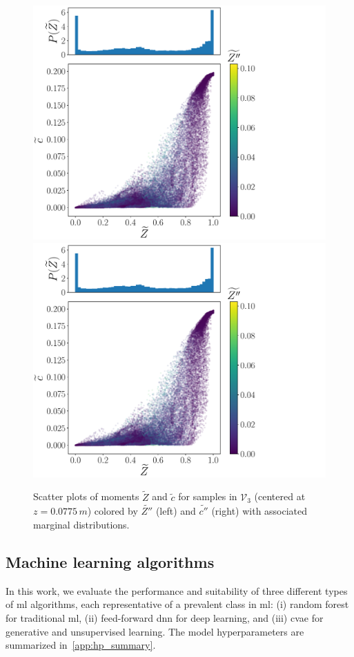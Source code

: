 \documentclass[review]{elsarticle}
\newcommand{\wt}[1]{\widetilde{#1}}
\begin{document}
\begin{figure}[!tbp]%
  \centering%
  \includegraphics[page=1, height=0.49\textwidth, trim=0.0cm 0cm 6.cm 0cm, clip]{./figs/inputs_dice_0004.pdf}\hfill%
  \includegraphics[page=2, height=0.49\textwidth, trim=1.8cm 0cm 1.8cm 0cm, clip]{./figs/inputs_dice_0004.pdf}%
  \caption{Scatter plots of moments $\wt{Z}$ and $\wt{c}$ for samples in $\mathcal{V}_3$ (centered at $z=0.0775\,\unit{m}$) colored by $\wt{Z''}$ (left) and $\wt{c''}$ (right) with associated marginal distributions.}\label{fig:inputs}%
\end{figure}%

\subsection{Machine learning algorithms}\label{sec:methods}
In this work, we evaluate the performance and suitability of three
different types of \gls{ml} algorithms, each representative of a
prevalent class in \gls{ml}: (i) random forest for traditional
\gls{ml}, (ii) feed-forward \gls{dnn} for deep learning, and (iii)
\gls{cvae} for generative and unsupervised learning. The model
hyperparameters are summarized in~\ref{app:hp_summary}.
\end{document}
